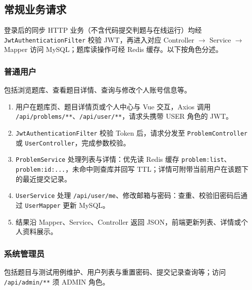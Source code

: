 \subsection{常规业务请求}

登录后的同步 HTTP 业务（不含代码提交判题与在线运行）均经 \texttt{JwtAuthenticationFilter} 校验 JWT，再进入对应 Controller $\rightarrow$ Service $\rightarrow$ Mapper 访问 MySQL；题库读操作可经 Redis 缓存。以下按角色分述。

\subsubsection{普通用户}

包括浏览题库、查看题目详情、查询与修改个人账号信息等。

\begin{enumerate}
    \item 用户在题库页、题目详情页或个人中心与 Vue 交互，Axios 调用 \texttt{/api/problems/**}、\texttt{/api/user/**}，请求头携带 USER 角色的 JWT。

    \item \texttt{JwtAuthenticationFilter} 校验 Token 后，请求分发至 \texttt{ProblemController} 或 \texttt{UserController}，完成参数校验。

    \item \texttt{ProblemService} 处理列表与详情：优先读 Redis 缓存 \texttt{problem:list}、\texttt{problem:id:...}，未命中则查库并回写 TTL；详情可附带当前用户在该题下的最近提交记录。

    \item \texttt{UserService} 处理 \texttt{/api/user/me}、修改邮箱与密码：查重、校验旧密码后通过 \texttt{UserMapper} 更新 MySQL。

    \item 结果沿 Mapper、Service、Controller 返回 JSON，前端更新列表、详情或个人资料展示。
\end{enumerate}


\subsubsection{系统管理员}

包括题目与测试用例维护、用户列表与重置密码、提交记录查询等；访问 \texttt{/api/admin/**} 须 ADMIN 角色。

